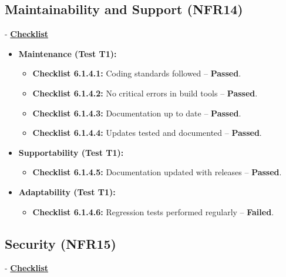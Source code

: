 \documentclass[12pt, titlepage]{article}
\begin{document}
\subsection{Maintainability and Support (NFR14)}  
- \textbf{\hyperlink{checklist-nfr14}{Checklist}}
\label{nfr14}

\begin{itemize}
    \item \textbf{Maintenance (Test T1):}  
    \begin{itemize}
        \item \textbf{Checklist 6.1.4.1:} Coding standards followed – \textbf{Passed}.  
        \item \textbf{Checklist 6.1.4.2:} No critical errors in build tools – \textbf{Passed}.  
        \item \textbf{Checklist 6.1.4.3:} Documentation up to date – \textbf{Passed}.  
        \item \textbf{Checklist 6.1.4.4:} Updates tested and documented – \textbf{Passed}.  
    \end{itemize}
    
    \item \textbf{Supportability (Test T1):}  
    \begin{itemize}
        \item \textbf{Checklist 6.1.4.5:} Documentation updated with releases – \textbf{Passed}.  
    \end{itemize}
    
    \item \textbf{Adaptability (Test T1):}  
    \begin{itemize}
        \item \textbf{Checklist 6.1.4.6:} Regression tests performed regularly – \textbf{Failed}.  
    \end{itemize}
\end{itemize}

\subsection{Security (NFR15)}  
- \textbf{\hyperlink{checklist-nfr15}{Checklist}}
\label{nfr15}
\end{document}
